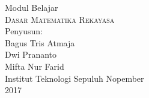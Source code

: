 \documentclass[12pt]{book}
\begin{document}
\begin{titlepage}
Modul Belajar\\
\textsc{\Huge Dasar Matematika Rekayasa}\\[13cm]
Penyusun:\\
Bagus Tris Atmaja \\
Dwi Prananto \\
Mifta Nur Farid\\

{\large
Institut Teknologi Sepuluh Nopember\\
    2017\\}
\end{titlepage}
\tableofcontents{}\listoffigures

















\printbibliography
\end{document}
